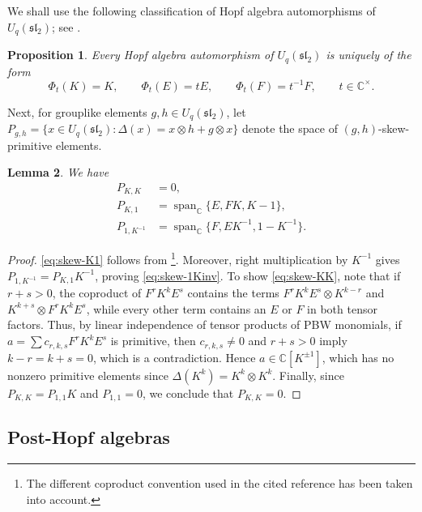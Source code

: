 \documentclass[11pt,english]{article}
\newcommand{\Del}{\Delta}
\newtheorem{lemma}{Lemma}
\newtheorem{proposition}[lemma]{Proposition}
\theoremstyle{definition}
\begin{document}
We shall use the following classification of Hopf
algebra automorphisms of $U_q(\mathfrak{sl}_2)$;
see \cite[\S 6.1.6]{KlimykSchmudgen}.

\begin{proposition}
\label{prop:aut}
Every Hopf algebra automorphism of
$U_q(\mathfrak{sl}_2)$ is uniquely of the form
\begin{equation}\label{eq:phit}
\Phi_t(K)=K,\qquad
\Phi_t(E)=tE,\qquad
\Phi_t(F)=t^{-1}F,
\qquad t\in\mathbb{C}^\times.
\end{equation}
\end{proposition}
Next, for grouplike elements $g,h\in U_q(\mathfrak{sl}_2)$,
let $P_{g,h}
=\{x\in U_q(\mathfrak{sl}_2):
\Del(x)=x\otimes h+g\otimes x\}$
denote the space of $(g,h)$-skew-primitive elements.
\begin{lemma}
We have
\begin{align}
P_{K,K}&=0,
\label{eq:skew-KK}\\
P_{K,1}
&=\operatorname{span}_\mathbb{C}\{E,FK,K-1\},
\label{eq:skew-K1}\\
P_{1,K^{-1}}
&=\operatorname{span}_\mathbb{C}\{F,EK^{-1},1-K^{-1}\}.
\label{eq:skew-1Kinv}
\end{align}
\end{lemma}
\begin{proof}
\eqref{eq:skew-K1} follows from
\cite[\S 3.1.2, proof of Proposition~6]{KlimykSchmudgen}\footnote{The different
coproduct convention used in the cited reference has been taken into account.}. Moreover, right multiplication
by $K^{-1}$ gives
$P_{1,K^{-1}}=P_{K,1}K^{-1}$, proving
\eqref{eq:skew-1Kinv}.
To show \eqref{eq:skew-KK}, note that if $r+s>0$, the coproduct of $F^rK^kE^s$ contains
the terms $F^rK^kE^s\otimes K^{k-r}$ and $K^{k+s}\otimes F^rK^kE^s$,
while every other term contains an $E$ or $F$ in
both tensor factors.
Thus, by linear independence of tensor products
of PBW monomials, if $a=\sum c_{r,k,s}F^rK^kE^s$
is primitive, then $c_{r,k,s}\neq0$ and $r+s>0$
imply $k-r=k+s=0$, which is a contradiction.
Hence $a\in\mathbb{C}[K^{\pm1}]$, which has no nonzero
primitive elements since $\Del(K^k)=K^k\otimes K^k$.
Finally, since $P_{K,K}=P_{1,1}K$ and
$P_{1,1}=0$, we conclude that $P_{K,K}=0$.
\end{proof}

\subsection{Post-Hopf algebras}\label{subsec:posthopf}
\end{document}
